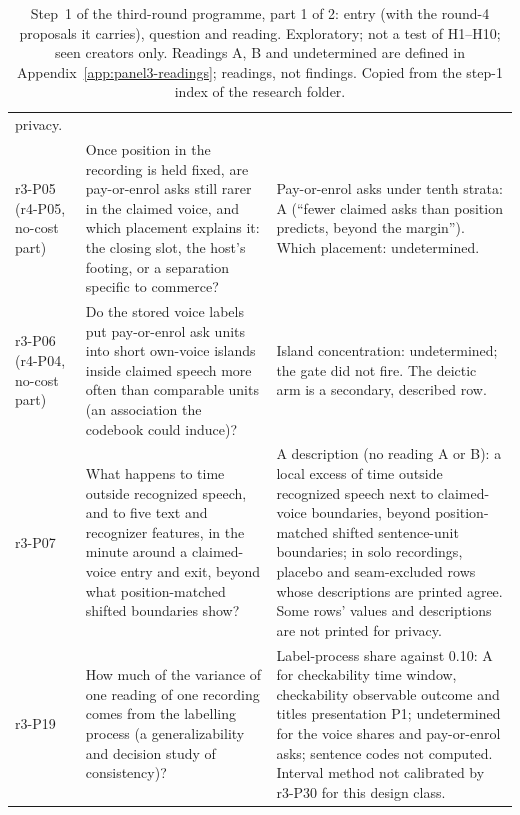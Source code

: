 \begin{table}[tp]
\begin{tabular}{@{}p{}p{}p{}@{}}
privacy. \\
r3-P05 (r4-P05, no-cost part) & Once position in the recording is held fixed, are pay-or-enrol asks still rarer in the
claimed voice, and which placement explains it: the closing slot, the host's footing, or a separation specific to
commerce? & Pay-or-enrol asks under tenth strata: A (``fewer claimed asks than position predicts, beyond the margin'').
Which placement: undetermined. \\
r3-P06 (r4-P04, no-cost part) & Do the stored voice labels put pay-or-enrol ask units into short own-voice islands
inside claimed speech more often than comparable units (an association the codebook could induce)? & Island
concentration: undetermined; the gate did not fire. The deictic arm is a secondary, described row. \\
r3-P07 & What happens to time outside recognized speech, and to five text and recognizer features, in the minute
around a claimed-voice entry and exit, beyond what position-matched shifted boundaries show? & A description (no
reading A or B): a local excess of time outside recognized speech next to claimed-voice boundaries, beyond
position-matched shifted sentence-unit boundaries; in solo recordings, placebo and seam-excluded rows whose descriptions
are printed agree. Some rows' values and descriptions are not printed for privacy. \\
r3-P19 & How much of the variance of one reading of one recording comes from the labelling process (a generalizability
and decision study of consistency)? & Label-process share against 0.10: A for checkability time window, checkability
observable outcome and titles presentation P1; undetermined for the voice shares and pay-or-enrol asks; sentence codes
not computed. Interval method not calibrated by r3-P30 for this design class. \\
\bottomrule
\end{tabular}
\caption{Step~1 of the third-round programme, part 1 of 2: entry (with the round-4 proposals it carries), question
and reading. Exploratory; not a test of H1--H10; seen creators only. Readings A, B and undetermined are defined in
Appendix~\ref{app:panel3-readings}; readings, not findings. Copied from the step-1 index of the research folder.
\LabelValidity}
\label{tab:panel3-step1}
\end{table}

